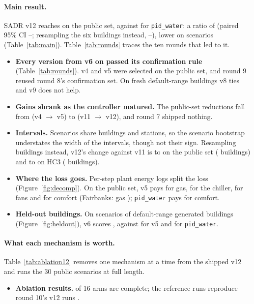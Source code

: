 \documentclass{article}
\begin{document}
\paragraph{Main result.} SADR v12 reaches \RTenConfPubCand{} on the public set, against \MetricPidWater{} for \texttt{pid\_water}: a ratio of \RElvPwRatio{} (paired 95\% CI \RElvPwRatioLo--\RElvPwRatioHi; resampling the six buildings instead, \RElvPwRatioCLo--\RElvPwRatioCHi), lower on \RElvPwWins{} scenarios (Table~\ref{tab:main}). Table~\ref{tab:rounds} traces the ten rounds that led to it.
\begin{itemize}
\item \textbf{Every version from v6 on passed its confirmation rule} (Table~\ref{tab:rounds}). v4 and v5 were selected on the public set, and round 9 reused round 8's confirmation set. On fresh default-range buildings v8 ties and v9 does not help.
\item \textbf{Gains shrank as the controller matured.} The public-set reductions fall from \CandWinnerRelRed{} (v4 $\to$ v5) to \RTenConfPubRelAbs{} (v11 $\to$ v12), and round 7 shipped nothing.
\item \textbf{Intervals.} Scenarios share buildings and stations, so the scenario bootstrap understates the width of the intervals, though not their sign. Resampling buildings instead, v12's change against v11 is \RElvClPubLo{} to \RElvClPubHi{} on the public set (\RElvClPubNB{} buildings) and \RElvClHCThreeLo{} to \RElvClHCThreeHi{} on HC3 (\RElvClHCThreeNB{} buildings).
\item \textbf{Where the loss goes.} Per-step plant energy logs split the loss (Figure~\ref{fig:decomp}). On the public set, v5 pays \DecPubVFiveGasShare{} for gas, \DecPubVFiveCoolingShare{} for the chiller, \DecPubVFiveFanShare{} for fans and \DecPubVFiveComfortShare{} for comfort (Fairbanks: gas \DecPubVFiveGasShareFairbanks); \texttt{pid\_water} pays \RegretSharePidWater{} for comfort.
\item \textbf{Held-out buildings.} On \NHeldAll{} scenarios of \NHeldAllBuild{} default-range generated buildings (Figure~\ref{fig:heldout}), v6 scores \HeldAllMetricOurs{}, against \HeldAllMetricOursVFive{} for v5 and \HeldAllMetricPidWater{} for \texttt{pid\_water}.
\end{itemize}

\paragraph{What each mechanism is worth.} Table~\ref{tab:ablation12} removes one mechanism at a time from the shipped v12 and runs the 30 public scenarios at full length.
\begin{itemize}
\item \textbf{Ablation results.} \RElvAbNDone{} of 16 arms are complete; the reference runs reproduce round 10's v12 runs \RElvAbRefMatch.
\end{itemize}
\end{document}
